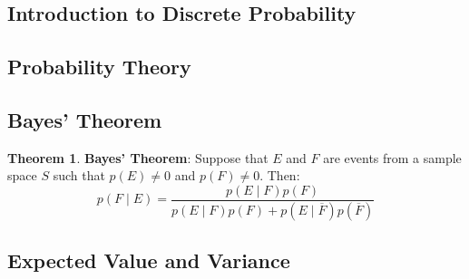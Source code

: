 \documentclass[article, 11pt]{article}
\theoremstyle{definition}
\newtheorem{theorem}{Theorem}[subsubsection]
\begin{document}
    \subsection{Introduction to Discrete Probability}
    \subsection{Probability Theory}
    \subsection{Bayes' Theorem}
    \begin{theorem} \textbf{Bayes' Theorem}: Suppose that $E$ and $F$ are events from a sample space $S$ such that $p(E) \neq 0$ and $p(F) \neq 0$. Then:
        \begin{equation*}
            p(F \mid E) = \frac{p(E \mid F)p(F)}{p(E \mid F)p(F) + p(E \mid \overline{F})p(\overline{F})}
        \end{equation*}
    \end{theorem}
    \subsection{Expected Value and Variance}
\end{document}
